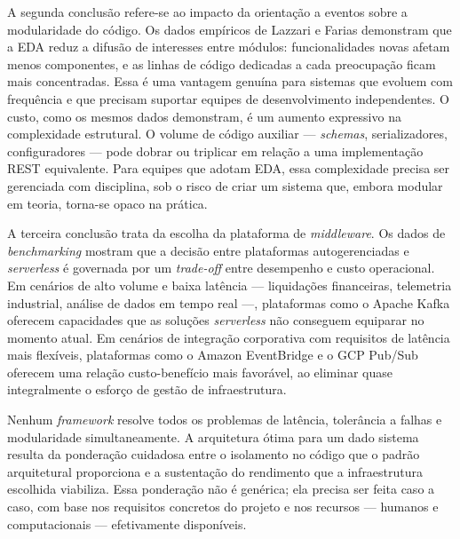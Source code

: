 \documentclass[12pt, a4paper]{article}
\begin{document}
A segunda conclusão refere-se ao impacto da orientação a eventos sobre a modularidade do código. Os dados empíricos de Lazzari e Farias \cite{lazzari2021} demonstram que a EDA reduz a difusão de interesses entre módulos: funcionalidades novas afetam menos componentes, e as linhas de código dedicadas a cada preocupação ficam mais concentradas. Essa é uma vantagem genuína para sistemas que evoluem com frequência e que precisam suportar equipes de desenvolvimento independentes. O custo, como os mesmos dados demonstram, é um aumento expressivo na complexidade estrutural. O volume de código auxiliar --- \textit{schemas}, serializadores, configuradores --- pode dobrar ou triplicar em relação a uma implementação REST equivalente. Para equipes que adotam EDA, essa complexidade precisa ser gerenciada com disciplina, sob o risco de criar um sistema que, embora modular em teoria, torna-se opaco na prática.

A terceira conclusão trata da escolha da plataforma de \textit{middleware}. Os dados de \textit{benchmarking} \cite{gopisetty2026, benchmarking2025} mostram que a decisão entre plataformas autogerenciadas e \textit{serverless} é governada por um \textit{trade-off} entre desempenho e custo operacional. Em cenários de alto volume e baixa latência --- liquidações financeiras, telemetria industrial, análise de dados em tempo real ---, plataformas como o Apache Kafka oferecem capacidades que as soluções \textit{serverless} não conseguem equiparar no momento atual. Em cenários de integração corporativa com requisitos de latência mais flexíveis, plataformas como o Amazon EventBridge e o GCP Pub/Sub oferecem uma relação custo-benefício mais favorável, ao eliminar quase integralmente o esforço de gestão de infraestrutura.

Nenhum \textit{framework} resolve todos os problemas de latência, tolerância a falhas e modularidade simultaneamente. A arquitetura ótima para um dado sistema resulta da ponderação cuidadosa entre o isolamento no código que o padrão arquitetural proporciona e a sustentação do rendimento que a infraestrutura escolhida viabiliza. Essa ponderação não é genérica; ela precisa ser feita caso a caso, com base nos requisitos concretos do projeto e nos recursos --- humanos e computacionais --- efetivamente disponíveis.
\end{document}
